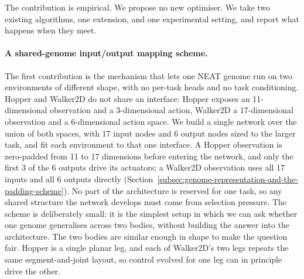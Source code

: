\documentclass[12pt]{article}
\begin{document}
The contribution is empirical.
We propose no new optimiser.
We take two existing algorithms, one extension, and one experimental setting, and report what happens when they meet.

\paragraph{A shared-genome input/output mapping scheme.}
The first contribution is the mechanism that lets one NEAT genome run on two environments of different shape, with no per-task heads and no task conditioning.
Hopper and Walker2D do not share an interface: Hopper exposes an 11-dimensional observation and a 3-dimensional action, Walker2D a 17-dimensional observation and a 6-dimensional action space.
We build a single network over the union of both spaces, with 17 input nodes and 6 output nodes sized to the larger task, and fit each environment to that one interface.
A Hopper observation is zero-padded from 11 to 17 dimensions before entering the network, and only the first 3 of the 6 outputs drive its actuators; a Walker2D observation uses all 17 inputs and all 6 outputs directly (Section~\ref{subsec:genome-representation-and-the-padding-scheme}).
No part of the architecture is reserved for one task, so any shared structure the network develops must come from selection pressure.
The scheme is deliberately small: it is the simplest setup in which we can ask whether one genome generalises across two bodies, without building the answer into the architecture.
The two bodies are similar enough in shape to make the question fair.
Hopper is a single planar leg, and each of Walker2D's two legs repeats the same segment-and-joint layout, so control evolved for one leg can in principle drive the other.
\end{document}

